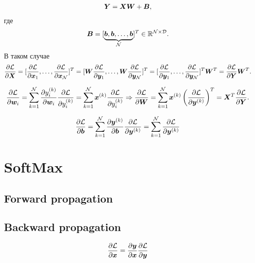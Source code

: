 \documentclass{report}
\numberwithin{theorem}{chapter}
\numberwithin{statement}{chapter}
\numberwithin{lemma}{chapter}
\theoremstyle{definition}
\numberwithin{task}{chapter}
\theoremstyle{remark}
\numberwithin{example}{chapter}
\theoremstyle{definition}
\numberwithin{definition}{chapter}
\theoremstyle{remark}
\theoremstyle{remark}
\numberwithin{lyrics}{section}
\begin{document}
\begin{gather*}
\boldsymbol{Y} = \boldsymbol{X} \boldsymbol{W} + \boldsymbol{B}, 
\end{gather*}
где 
$$\boldsymbol{B} = [\underbrace{\boldsymbol{b}, \boldsymbol{b}, \dots, \boldsymbol{b}}_{\mathcal{N}}]^T \in \mathbb{R}^{\mathcal{N} \times \mathcal{D}}.$$
В таком случае 
\begin{gather*}
\frac{\partial \mathcal{L} }{\partial \boldsymbol{X}} = [\frac{\partial \mathcal{L} }{\partial \boldsymbol{x}_1}, \dots, \frac{\partial \mathcal{L} }{\partial \boldsymbol{x}_{\mathcal{N}}}]^T = [\boldsymbol{W}  \frac{\partial \mathcal{L} }{\partial \boldsymbol{y}_1}, \dots,  \boldsymbol{W} \frac{\partial \mathcal{L} }{\partial \boldsymbol{y}_{\mathcal{N}}}]^T =  [\frac{\partial \mathcal{L} }{\partial \boldsymbol{y}_1}, \dots,  \frac{\partial \mathcal{L} }{\partial \boldsymbol{y}_{\mathcal{N}}}]^T \boldsymbol{W}^T =  \frac{\partial \mathcal{L} }{\partial \boldsymbol{Y}} \boldsymbol{W}^T.
\end{gather*}

\begin{gather*}
\frac{\partial \mathcal{L} }{\partial \boldsymbol{w}_i} = \sum\limits_{k=1}^{\mathcal{N}} \frac{\partial y_i^{(k)} }{\partial \boldsymbol{w}_i} \frac{\partial \mathcal{L} }{\partial y_i^{(k)}} = \sum\limits_{k=1}^{\mathcal{N}} \boldsymbol{x}^{(k)} \frac{\partial \mathcal{L} }{\partial y_i^{(k)}} \Rightarrow \frac{\partial \mathcal{L} }{\partial \boldsymbol{W}} = \sum\limits_{k=1}^{\mathcal{N}} \boldsymbol{x}^{(k)} \left(\frac{\partial \mathcal{L} }{\partial \boldsymbol{y}^{(k)}}\right)^T = \boldsymbol{X}^T \frac{\partial \mathcal{L} }{\partial \boldsymbol{Y}}.
\end{gather*}

\begin{gather*}
\frac{\partial \mathcal{L} }{\partial \boldsymbol{b}} = \sum\limits_{k=1}^{\mathcal{N}} \frac{\partial \boldsymbol{y}^{(k)} }{\partial \boldsymbol{b}} \frac{\partial \mathcal{L} }{\partial \boldsymbol{y}^{(k)}} = \sum\limits_{k=1}^{\mathcal{N}} \frac{\partial \mathcal{L} }{\partial \boldsymbol{y}^{(k)}}
\end{gather*}

\section{SoftMax}

\subsection{Forward propagation}

\subsection{Backward propagation}

\begin{gather*}
\frac{\partial \mathcal{L} }{\partial \boldsymbol{x}} = \frac{\partial \boldsymbol{y} }{\partial \boldsymbol{x}} \frac{\partial \mathcal{L} }{\partial \boldsymbol{y}}
\end{gather*}
\end{document}
